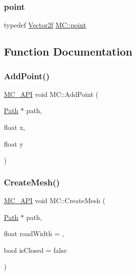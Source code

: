 \subsubsection{\texorpdfstring{point}{point}}
{\footnotesize\ttfamily typedef \mbox{\hyperlink{struct_m_c_1_1_vector2f}{Vector2f}} \mbox{\hyperlink{namespace_m_c_ae49fc0a0f3e78b01be72793719d33214}{M\+C\+::point}}}



\subsection{Function Documentation}
\mbox{\label{namespace_m_c_a48710ffe327fd3e394d0e3fdb689ce1a}} 
\subsubsection{\texorpdfstring{AddPoint()}{AddPoint()}}
{\footnotesize\ttfamily \mbox{\hyperlink{_mesh___creator___controller_8hpp_a529916b90fdb2765a7b955fded854b0a}{M\+C\+\_\+\+A\+PI}} void M\+C\+::\+Add\+Point (\begin{DoxyParamCaption}\item[{\mbox{\hyperlink{class_m_c_1_1_path}{Path}} $\ast$}]{path,  }\item[{float}]{x,  }\item[{float}]{y }\end{DoxyParamCaption})}

\mbox{\label{namespace_m_c_a0eddfa2ea15d9be8c618a192098380ef}} 
\subsubsection{\texorpdfstring{CreateMesh()}{CreateMesh()}}
{\footnotesize\ttfamily \mbox{\hyperlink{_mesh___creator___controller_8hpp_a529916b90fdb2765a7b955fded854b0a}{M\+C\+\_\+\+A\+PI}} void M\+C\+::\+Create\+Mesh (\begin{DoxyParamCaption}\item[{\mbox{\hyperlink{class_m_c_1_1_path}{Path}} $\ast$}]{path,  }\item[{float}]{road\+Width = {},  }\item[{bool}]{is\+Closed = {\ttfamily false} }\end{DoxyParamCaption})}

